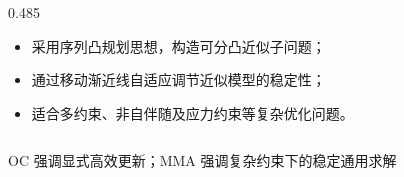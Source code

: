 \documentclass[notheorems]{beamer}
\begin{document}
\begin{frame}
\begin{columns}[T, totalwidth=\linewidth]
\begin{column}{0.485\linewidth}
\begin{tcolorbox}
					{\fontsize{7.75}{11.0}\selectfont\sffamily
						
						\begin{itemize}
							\setlength{\itemsep}{0.95em}
							
							\item[\circnum{01}]
							采用序列凸规划思想，构造可分凸近似子问题；
							
							\item[\circnum{02}]
							通过移动渐近线自适应调节近似模型的稳定性；
							
							\item[\circnum{03}]
							适合多约束、非自伴随及应力约束等复杂优化问题。
						\end{itemize}
					}
				\end{tcolorbox}
			\end{column}
			
		\end{columns}
		
		\begin{tcolorbox}[
			colback=structure.fg, colframe=structure.fg,
			arc=3pt, boxrule=0pt,
			top=4pt, bottom=4pt, left=8pt, right=8pt]
			\centering
			{\fontsize{8.5}{12}\selectfont\sffamily\color{white}
				OC 强调显式高效更新；MMA 强调复杂约束下的稳定通用求解}
		\end{tcolorbox}
		
	\end{frame}
	
	
\end{document}
